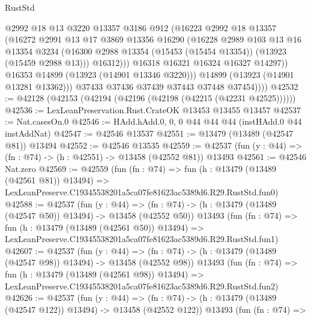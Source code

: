 \begin{lexlean}{RustStd}
\begin{coremodule}
                    @2992
                    @18
                    @13
                    @3220
                    @13357
                    @3186
                    @912
                    (@16223
                      @2992
                      @18
                      @13357
                      (@16272
                        @2991
                        @13
                        @17
                        @3869
                        @13356
                        @16290
                        (@16228
                          @2989
                          @103
                          @13
                          @16
                          @13354
                          @3234
                          (@16300 @2988 @13354 (@15453 (@15454 @13354)) (@13923 (@15459 @2988 @13)))
                          @16312)))
                    @16318
                    @16321
                    @16324
                    @16327
                    @14297))
                @16353
                @14899
                (@13923 (@14901 @13346 @3220)))
              @14899
              (@13923 (@14901 @13281 @13362)))
            @37433
            @37436
            @37439
            @37443
            @37448
            @37454))))
@42532 := @42128 (@42153 (@42194 (@42196 (@42198 (@42215 (@42231 @42525))))))
@42536 := LexLeanPreservation.Rust.CrateOK @13453 @13455 @13457
@42537 := Nat.casesOn.{0}
@42546 := HAdd.hAdd.{0, 0, 0} @44 @44 @44 (instHAdd.{0} @44 instAddNat)
@42547 := @42546 @13537
@42551 := @13479 (@13489 (@42547 @81)) @13494
@42552 := @42546 @13535
@42559 := @42537 (fun (y : @44) => (fn : @74) -> (h : @42551) -> @13458 (@42552 @81)) @13493
@42561 := @42546 Nat.zero
@42569 := @42559
    (fun (fn : @74) =>
    fun (h : @13479 (@13489 (@42561 @81)) @13494) =>
    LexLeanPreserve.C19345538201a5ca07fe81623ac5389d6.R29.RustStd.fun0)
@42588 := @42537
    (fun (y : @44) =>
    (fn : @74) -> (h : @13479 (@13489 (@42547 @50)) @13494) -> @13458 (@42552 @50))
    @13493
    (fun (fn : @74) =>
    fun (h : @13479 (@13489 (@42561 @50)) @13494) =>
    LexLeanPreserve.C19345538201a5ca07fe81623ac5389d6.R29.RustStd.fun1)
@42607 := @42537
    (fun (y : @44) =>
    (fn : @74) -> (h : @13479 (@13489 (@42547 @98)) @13494) -> @13458 (@42552 @98))
    @13493
    (fun (fn : @74) =>
    fun (h : @13479 (@13489 (@42561 @98)) @13494) =>
    LexLeanPreserve.C19345538201a5ca07fe81623ac5389d6.R29.RustStd.fun2)
@42626 := @42537
    (fun (y : @44) =>
    (fn : @74) -> (h : @13479 (@13489 (@42547 @122)) @13494) -> @13458 (@42552 @122))
    @13493
    (fun (fn : @74) =>

\end{coremodule}
\end{lexlean}
